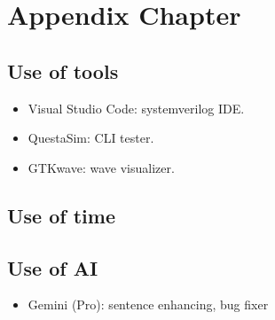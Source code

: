 \appendix
\chapter{Appendix Chapter}

\section{Use of tools}

\begin{itemize}
    \item Visual Studio Code: systemverilog IDE.
    \item QuestaSim: CLI tester.
    \item GTKwave: wave visualizer.
\end{itemize}

\section{Use of time}

\section{Use of AI}

\begin{itemize}
    \item Gemini (Pro): sentence enhancing, bug fixer
\end{itemize}
